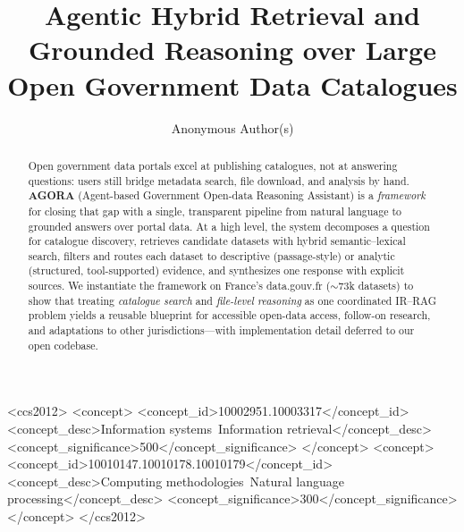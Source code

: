 \documentclass[sigconf,anonymous]{acmart}
\begin{document}
\title{Agentic Hybrid Retrieval and Grounded Reasoning over Large Open Government Data Catalogues}

\author{Anonymous Author(s)}
\renewcommand{\shortauthors}{Anonymous Author(s)}

\begin{CCSXML}
<ccs2012>
<concept>
<concept_id>10002951.10003317</concept_id>
<concept_desc>Information systems~Information retrieval</concept_desc>
<concept_significance>500</concept_significance>
</concept>
<concept>
<concept_id>10010147.10010178.10010179</concept_id>
<concept_desc>Computing methodologies~Natural language processing</concept_desc>
<concept_significance>300</concept_significance>
</concept>
</ccs2012>
\end{CCSXML}


\begin{abstract}
Open government data portals excel at publishing catalogues, not at answering questions: users still bridge metadata search, file download, and analysis by hand. \textbf{AGORA} (Agent-based Government Open-data Reasoning Assistant) is a \emph{framework} for closing that gap with a single, transparent pipeline from natural language to grounded answers over portal data.
At a high level, the system decomposes a question for catalogue discovery, retrieves candidate datasets with hybrid semantic--lexical search, filters and routes each dataset to descriptive (passage-style) or analytic (structured, tool-supported) evidence, and synthesizes one response with explicit sources.
We instantiate the framework on France's data.gouv.fr ($\sim$73k datasets) to show that treating \emph{catalogue search} and \emph{file-level reasoning} as one coordinated IR--RAG problem yields a reusable blueprint for accessible open-data access, follow-on research, and adaptations to other jurisdictions---with implementation detail deferred to our open codebase.
\end{abstract}

\maketitle
\end{document}
